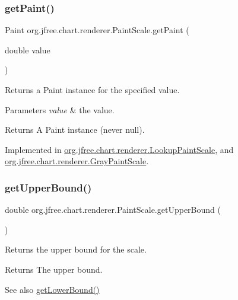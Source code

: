 \subsubsection{\texorpdfstring{get\+Paint()}{getPaint()}}
{\footnotesize\ttfamily Paint org.\+jfree.\+chart.\+renderer.\+Paint\+Scale.\+get\+Paint (\begin{DoxyParamCaption}\item[{double}]{value }\end{DoxyParamCaption})}

Returns a {\ttfamily Paint} instance for the specified value.


\begin{DoxyParams}{Parameters}
{\em value} & the value.\\
\hline
\end{DoxyParams}
\begin{DoxyReturn}{Returns}
A {\ttfamily Paint} instance (never {\ttfamily null}). 
\end{DoxyReturn}


Implemented in \mbox{\hyperlink{classorg_1_1jfree_1_1chart_1_1renderer_1_1_lookup_paint_scale_a8a1dcf9c72f6844f8a0aee28b98e4134}{org.\+jfree.\+chart.\+renderer.\+Lookup\+Paint\+Scale}}, and \mbox{\hyperlink{classorg_1_1jfree_1_1chart_1_1renderer_1_1_gray_paint_scale_af4b201fbb96918235cc5e92bd5815910}{org.\+jfree.\+chart.\+renderer.\+Gray\+Paint\+Scale}}.

\mbox{\label{interfaceorg_1_1jfree_1_1chart_1_1renderer_1_1_paint_scale_abf6986bb5661248213645ea975828495}} 
\subsubsection{\texorpdfstring{get\+Upper\+Bound()}{getUpperBound()}}
{\footnotesize\ttfamily double org.\+jfree.\+chart.\+renderer.\+Paint\+Scale.\+get\+Upper\+Bound (\begin{DoxyParamCaption}{ }\end{DoxyParamCaption})}

Returns the upper bound for the scale.

\begin{DoxyReturn}{Returns}
The upper bound.
\end{DoxyReturn}
\begin{DoxySeeAlso}{See also}
\mbox{\hyperlink{interfaceorg_1_1jfree_1_1chart_1_1renderer_1_1_paint_scale_a125f1d305abf1f3764b62f5a9c5fabbd}{get\+Lower\+Bound()}} 
\end{DoxySeeAlso}


